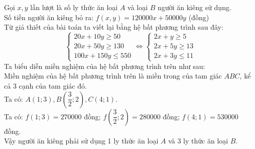 \begin{bt}
{\begin{center}
	\end{center}
	Gọi $x, y$ lần lượt là số ly thức ăn loại $A$ và loại $B$ người ăn kiêng sử dụng.\\
	Số tiền người ăn kiêng bỏ ra: $f(x, y)=120000 x+50000 y$ (đồng)\\
	Từ giả thiết của bài toán ta viết lại bằng hệ bất phương trình sau đây:
	$$
	\left\{\begin{array} { l } 
		{ 2 0 x + 1 0 y \geq 5 0 } \\
		{ 2 0 x + 5 0 y \geq 1 3 0 } \\
		{ 1 0 0 x + 1 5 0 y \leq 5 5 0 }
	\end{array} \Leftrightarrow \left\{\begin{array}{l}
		2 x+y \geq 5 \\
		2 x+5 y \geq 13 \\
		2 x+3 y \leq 11
	\end{array}\right.\right.
	$$
	Ta biểu diễn miền nghiệm của hệ bất phương trình trên như sau:\\
	Miền nghiệm của hệ bất phương trình trên là miền trong của tam giác $A B C$, kể cả 3 cạnh của tam giác đó.\\
	Ta có: $A(1 ; 3), B\left(\dfrac{3}{2} ; 2\right), C(4 ; 1)$.\\
	Ta có: $f(1 ; 3)=270000$ đồng; $f\left(\dfrac{3}{2} ; 2\right)=280000$ đồng; $f(4 ; 1)=530000$ đồng.\\
	Vậy người ăn kiêng phải sử dụng 1 ly thức ăn loại $A$ và 3 ly thức ăn loại $B$.
	}
\end{bt}

